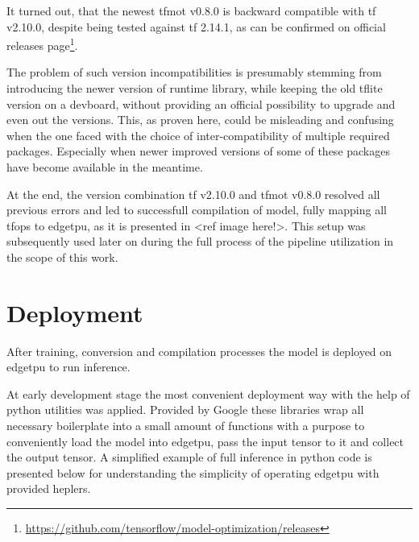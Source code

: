 {It turned out, that the newest \gls{tfmot} v0.8.0 is backward compatible with \gls{tf} v2.10.0, despite being tested against \gls{tf} 2.14.1,
as can be confirmed on official releases page\footnote{\url{https://github.com/tensorflow/model-optimization/releases}}.

The problem of such version incompatibilities is presumably stemming from introducing the newer version of  runtime library,
while keeping the old \gls{tflite} version on a \gls{devboard}, without providing an official possibility to upgrade and even out the versions.
This, as proven here, could be misleading and confusing when the one faced with the choice of inter-compatibility of multiple required packages.
Especially when newer improved versions of some of these packages have become available in the meantime.

At the end, the version combination \gls{tf} v2.10.0 and \gls{tfmot} v0.8.0 resolved all previous errors and led to successfull compilation of model,
fully mapping all \glspl{tfop} to \gls{edgetpu}, as it is presented in <ref image here!>.
This setup was subsequently used later on during the full process of the pipeline utilization in the scope of this work.


\section{Deployment}
\label{sec:deployment}

After training, conversion and compilation processes the  model is deployed on \gls{edgetpu} to run inference.

At early development stage the most convenient deployment way with the help of python utilities was applied.
Provided by Google these libraries wrap all necessary boilerplate into a small amount of functions with a purpose to conveniently load the model into \gls{edgetpu},
pass the input tensor to it and collect the output tensor. A simplified example of full inference in python code is presented below for understanding the simplicity of
operating \gls{edgetpu} with provided heplers.

%
%
%
%

}

